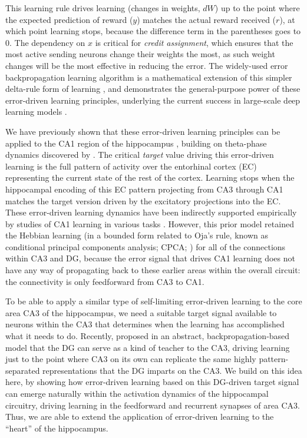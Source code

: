 \documentclass[11pt,twoside]{article}
\newif\myifpdf
\begin{document}
This learning rule drives learning (changes in weights, $dW$) up to the point where the expected prediction of reward ($y$) matches the actual reward received ($r$), at which point learning stops, because the difference term in the parentheses goes to 0. The dependency on $x$ is critical for \emph{credit assignment}, which ensures that the most active sending neurons change their weights the most, as such weight changes will be the most effective in reducing the error.  The widely-used error backpropagation learning algorithm is a mathematical extension of this simpler delta-rule form of learning \citep{RumelhartHintonWilliams86}, and demonstrates the general-purpose power of these error-driven learning principles, underlying the current success in large-scale deep learning models \citep{LeCunBengioHinton15}.

We have previously shown that these error-driven learning principles can be applied to the CA1 region of the hippocampus \citep{KetzMorkondaOReilly13}, building on theta-phase dynamics discovered by \citet{HasselmoBodelonWyble02}.  The critical \emph{target} value driving this error-driven learning is the full pattern of activity over the entorhinal cortex (EC) representing the current state of the rest of the cortex.  Learning stops when the hippocampal encoding of this EC pattern projecting from CA3 through CA1 matches the target version driven by the excitatory projections into the EC.  These error-driven learning dynamics have been indirectly supported empirically by studies of CA1 learning in various tasks \citep{SchapiroTurk-BrowneNormanEtAl16,SchapiroTurk-BrowneBotvinickEtAl17}.  However, this prior model retained the Hebbian learning (in a bounded form related to Oja's rule, known as conditional principal components analysis; CPCA; \citealp{OReillyMunakata00}) for all of the connections within CA3 and DG, because the error signal that drives CA1 learning does not have any way of propagating back to these earlier areas within the overall circuit: the connectivity is only feedforward from CA3 to CA1.

To be able to apply a similar type of self-limiting error-driven learning to the core area CA3 of the hippocampus, we need a suitable target signal available to neurons within the CA3 that determines when the learning has accomplished what it needs to do.  Recently, \citet{KowadloAhmedRawlinson20} proposed in an abstract, backpropagation-based model that the DG can serve as a kind of teacher to the CA3, driving learning just to the point where CA3 on its own can replicate the same highly pattern-separated representations that the DG imparts on the CA3.  We build on this idea here, by showing how error-driven learning based on this DG-driven target signal can emerge naturally within the activation dynamics of the hippocampal circuitry, driving learning in the feedforward and recurrent synapses of area CA3.  Thus, we are able to extend the application of error-driven learning to the ``heart'' of the hippocampus.
\end{document}
